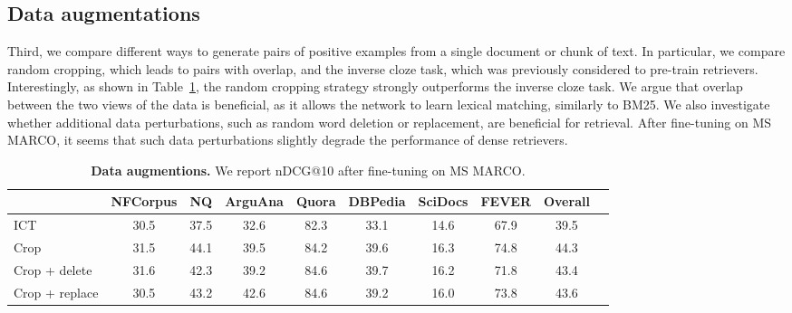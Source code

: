 

\subsection{Data augmentations}
Third, we compare different ways to generate pairs of positive examples from a single document or chunk of text.
In particular, we compare random cropping, which leads to pairs with overlap, and the inverse cloze task, which was previously considered to pre-train retrievers.
Interestingly, as shown in Table~\ref{tab:data_augmentation}, the random cropping strategy strongly outperforms the inverse cloze task.
We argue that overlap between the two views of the data is beneficial, as it allows the network to learn lexical matching, similarly to BM25.
We also investigate whether additional data perturbations, such as random word deletion or replacement, are beneficial for retrieval.
After fine-tuning on MS MARCO, it seems that such data perturbations slightly degrade the performance of dense retrievers.

\begin{table}[h]
  \center
  \small
  \begin{tabular}{l ccccccccc}
    \toprule
    & NFCorpus & NQ & ArguAna & Quora & DBPedia & SciDocs & FEVER & Overall \\
    \midrule
    ICT             & 30.5 & 37.5 & 32.6 & 82.3 & 33.1 & 14.6 & 67.9 & 39.5 \\
    Crop            & 31.5 & 44.1 & 39.5 & 84.2 & 39.6 & 16.3 & 74.8 & 44.3 \\ %
    Crop + delete   & 31.6 & 42.3 & 39.2 & 84.6 & 39.7 & 16.2 & 71.8 & 43.4 \\ %
    Crop + replace  & 30.5 & 43.2 & 42.6 & 84.6 & 39.2 & 16.0 & 73.8 & 43.6 \\ %
    \bottomrule
  \end{tabular}
  \caption{\textbf{Data augmentions.} We report nDCG@10 after fine-tuning on MS MARCO.}
  \label{tab:data_augmentation}
\end{table}


